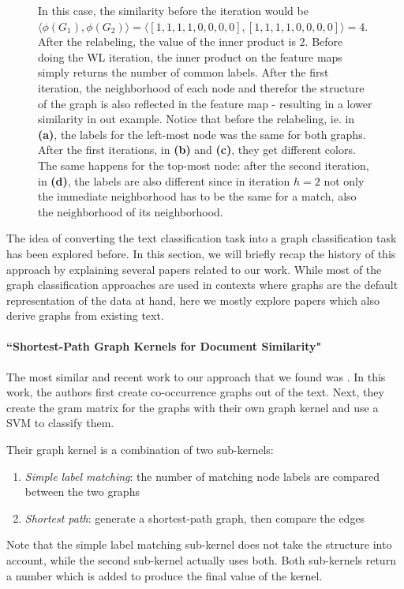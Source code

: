 \begin{figure}[htb!]
{  In this case, the similarity before the iteration would be $\langle \phi(G_1), \phi(G_2) \rangle = \langle [1, 1, 1, 1, 0, 0, 0, 0], [1, 1, 1, 1, 0, 0, 0, 0] \rangle = 4$. After the relabeling, the value of the inner product is $2$.
  Before doing the WL iteration, the inner product on the feature maps simply returns the number of common labels. After the first iteration, the neighborhood of each node and therefor the structure of the graph is also reflected in the feature map - resulting in a lower similarity in out example.
  Notice that before the relabeling, ie. in \textbf{(a)}, the labels for the left-most node was the same for both graphs. After the first iterations, in \textbf{(b)} and \textbf{(c)}, they get different colors.
  The same happens for the top-most node: after the second iteration, in \textbf{(d)}, the labels are also different since in iteration $h=2$ not only the immediate neighborhood has to be the same for a match, also the neighborhood of its neighborhood.}
	\label{fig:wl_example}
\end{figure}


The idea of converting the text classification task into a graph classification task has been explored before.
In this section, we will briefly recap the history of this approach by explaining several papers related to our work.
While most of the graph classification approaches are used in contexts where graphs are the default representation of the data at hand, here we mostly explore papers which also derive graphs from existing text.


\paragraph{``Shortest-Path Graph Kernels for Document Similarity" \cite{Nikolentzos2017a}}
The most similar and recent work to our approach that we found was \cite{Nikolentzos2017a}. In this work, the authors first create co-occurrence graphs out of the text. Next, they create the gram matrix for the graphs with their own graph kernel and use a SVM to classify them.

Their graph kernel is a combination of two sub-kernels:
\begin{enumerate}
    \item{\textit{Simple label matching}: the number of matching node labels are compared between the two graphs}
    \item{\textit{Shortest path}: generate a shortest-path graph, then compare the edges}
\end{enumerate}
Note that the simple label matching sub-kernel does not take the structure into account, while the second sub-kernel actually uses both.
Both sub-kernels return a number which is added to produce the final value of the kernel.

